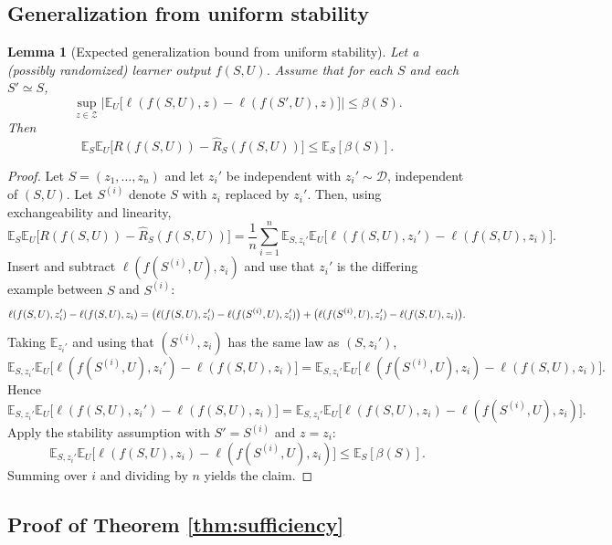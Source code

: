 \documentclass{article}
\newtheorem{lemma}[theorem]{Lemma}
\numberwithin{equation}{section}
\begin{document}
\subsection{Generalization from uniform stability}
\label{app:gen-from-stab}

\begin{lemma}[Expected generalization bound from uniform stability]
	\label{lem:stab-to-gen}
	Let a (possibly randomized) learner output $f(S,U)$.
	Assume that for each $S$ and each $S'\simeq S$,
	\[
	\sup_{z\in\mathcal{Z}}
	\Big|
	\mathbb{E}_U\big[\ell(f(S,U),z)-\ell(f(S',U),z)\big]
	\Big|
	\le
	\beta(S).
	\]
	Then
	\[
	\mathbb{E}_S\mathbb{E}_U\big[R(f(S,U))-\widehat{R}_S(f(S,U))\big]
	\le
	\mathbb{E}_S[\beta(S)].
	\]
\end{lemma}

\begin{proof}
	Let $S=(z_1,\dots,z_n)$ and let $z_i'$ be independent with $z_i'\sim\mathcal{D}$, independent of $(S,U)$.
	Let $S^{(i)}$ denote $S$ with $z_i$ replaced by $z_i'$.
	Then, using exchangeability and linearity,
	\[
	\mathbb{E}_S\mathbb{E}_U\big[R(f(S,U))-\widehat{R}_S(f(S,U))\big]
	=
	\frac{1}{n}\sum_{i=1}^n
	\mathbb{E}_{S,z_i'}\mathbb{E}_U\big[\ell(f(S,U),z_i')-\ell(f(S,U),z_i)\big].
	\]
	Insert and subtract $\ell(f(S^{(i)},U),z_i)$ and use that $z_i'$ is the differing example between $S$ and $S^{(i)}$:
	\[
	\ell(f(S,U),z_i')-\ell(f(S,U),z_i)
	=
	\big(\ell(f(S,U),z_i')-\ell(f(S^{(i)},U),z_i')\big)\\
	+
	\big(\ell(f(S^{(i)},U),z_i')-\ell(f(S,U),z_i)\big).
	\]
	Taking $\mathbb{E}_{z_i'}$ and using that $(S^{(i)},z_i)$ has the same law as $(S,z_i')$,
	\[
	\mathbb{E}_{S,z_i'}\mathbb{E}_U\big[\ell(f(S^{(i)},U),z_i')-\ell(f(S,U),z_i)\big]
	=
	\mathbb{E}_{S,z_i'}\mathbb{E}_U\big[\ell(f(S^{(i)},U),z_i)-\ell(f(S,U),z_i)\big].
	\]
	Hence
	\[
	\mathbb{E}_{S,z_i'}\mathbb{E}_U\big[\ell(f(S,U),z_i')-\ell(f(S,U),z_i)\big]
	=
	\mathbb{E}_{S,z_i'}\mathbb{E}_U\big[\ell(f(S,U),z_i)-\ell(f(S^{(i)},U),z_i)\big].
	\]
	Apply the stability assumption with $S'\!=\!S^{(i)}$ and $z\!=\!z_i$:
	\[
	\mathbb{E}_{S,z_i'}\mathbb{E}_U\big[\ell(f(S,U),z_i)-\ell(f(S^{(i)},U),z_i)\big]
	\le
	\mathbb{E}_S[\beta(S)].
	\]
	Summing over $i$ and dividing by $n$ yields the claim.
\end{proof}

\subsection{Proof of Theorem \ref{thm:sufficiency}}
\label{app:proof-sufficiency}
\end{document}
